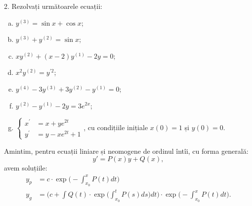 \vspace{1cm}

2. Rezolvați următoarele ecuații:
\begin{enumerate}[(a)]
  \item $ y^{(3)} = \sin x + \cos x $;
  \item $ y^{(3)} + y^{(2)} = \sin x $;
  \item $ xy^{(2)} + (x - 2)y^{(1)} - 2y = 0 $;
  \item $ x^2 y^{(2)} = y^{\prime 2} $;
  \item $ y^{(4)} - 3y^{(3)} + 3y^{(2)} - y^{(1)} = 0 $;
  \item $ y^{(2)} - y^{(1)} - 2y = 3e^{2x} $;
  \item $ \begin{cases}
      x^\prime &= x + ye^{2t} \\
      y^\prime &= y - xe^{2t} + 1
    \end{cases} $,
    cu condițiile inițiale $ x(0) = 1 $ și $ y(0) = 0 $.
\end{enumerate}

Amintim, pentru ecuații liniare și neomogene de ordinul întîi, cu forma generală:
\[
  y' = P(x) y + Q(x),
\]
avem soluțiile:
\begin{align*}
  y_p &= c \cdot \exp\Big( - \int_{x_0}^x P(t) dt \Big) \\
  y_g &= \Big( c + \int Q(t) \cdot \exp \Big( \int_{x_0}^t P(s) ds \Big) dt \Big) \cdot \exp \Big(- \int_{x_0}^x P(t) dt \Big).
\end{align*}

